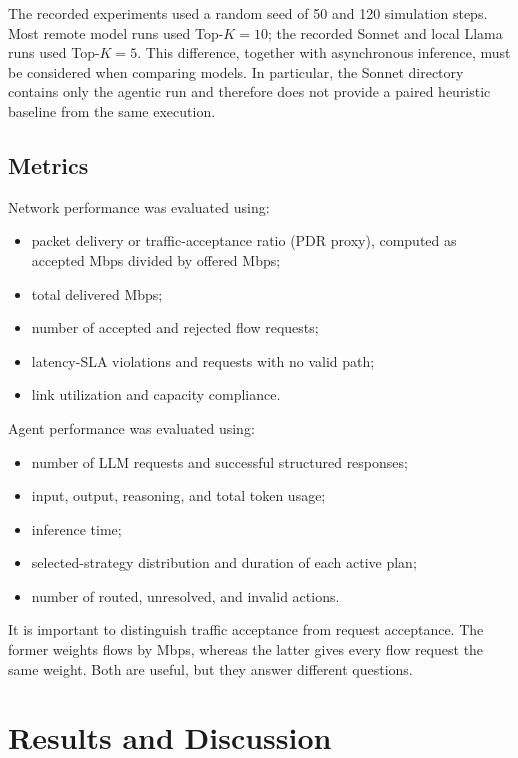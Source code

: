 The recorded experiments used a random seed of 50 and 120 simulation steps. Most remote
model runs used Top-$K=10$; the recorded Sonnet and local Llama runs used Top-$K=5$.
This difference, together with asynchronous inference, must be considered when comparing
models. In particular, the Sonnet directory contains only the agentic run and therefore
does not provide a paired heuristic baseline from the same execution.

\subsection{Metrics}

Network performance was evaluated using:

\begin{itemize}
    \item packet delivery or traffic-acceptance ratio (PDR proxy), computed as accepted
    Mbps divided by offered Mbps;
    \item total delivered Mbps;
    \item number of accepted and rejected flow requests;
    \item latency-SLA violations and requests with no valid path;
    \item link utilization and capacity compliance.
\end{itemize}

Agent performance was evaluated using:

\begin{itemize}
    \item number of LLM requests and successful structured responses;
    \item input, output, reasoning, and total token usage;
    \item inference time;
    \item selected-strategy distribution and duration of each active plan;
    \item number of routed, unresolved, and invalid actions.
\end{itemize}

It is important to distinguish traffic acceptance from request acceptance. The former
weights flows by Mbps, whereas the latter gives every flow request the same weight.
Both are useful, but they answer different questions.


\section{Results and Discussion}

